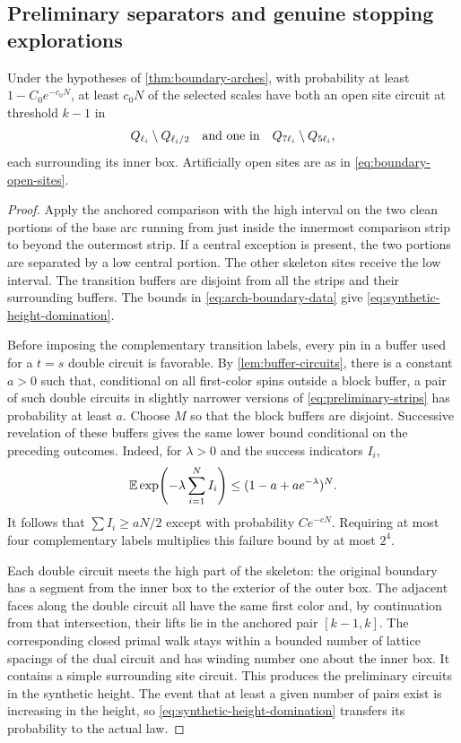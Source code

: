 \subsection{Preliminary separators and genuine stopping explorations}

\begin{lemma}\label{lem:preliminary-circuits}
Under the hypotheses of \cref{thm:boundary-arches}, with probability at least
$1-C_0e^{-c_0N}$, at least $c_0N$ of the selected scales have both an open
site circuit at threshold $k-1$ in
\begin{equation}\label{eq:preliminary-strips}
 Q_{\ell_i}\setminus Q_{\ell_i/2}
       \quad\hbox{and one in}\quad
 Q_{7\ell_i}\setminus Q_{5\ell_i},
\end{equation}
each surrounding its inner box.  Artificially open sites are as in
\eqref{eq:boundary-open-sites}.
\end{lemma}

\begin{proof}
Apply the anchored comparison with the high interval on the two clean
portions of the base arc running from just inside the innermost comparison
strip to beyond the outermost strip.  If a central exception is present,
the two portions are separated by a low central portion.  The other
skeleton sites receive the low interval.  The transition buffers are
disjoint from all the strips and their surrounding buffers.  The bounds in
\eqref{eq:arch-boundary-data} give \eqref{eq:synthetic-height-domination}.

Before imposing the complementary transition labels, every pin in a buffer
used for a $t=s$ double circuit is favorable.  By
\cref{lem:buffer-circuits}, there is a constant $a>0$ such that, conditional
on all first-color spins outside a block buffer, a pair of such double
circuits in slightly narrower versions of \eqref{eq:preliminary-strips}
has probability at least $a$.  Choose $M$ so that the block buffers are
disjoint.  Successive revelation of these buffers gives the same lower
bound conditional on the preceding outcomes.  Indeed, for $\lambda>0$ and
the success indicators $I_i$,
\[
 \mathbb E\exp\!\left(-\lambda\sum_{i=1}^N I_i\right)
       \le (1-a+ae^{-\lambda})^N.
\]
It follows that $\sum I_i\ge aN/2$ except with probability $C e^{-cN}$.
Requiring at most four complementary labels multiplies this failure bound
by at most $2^4$.

Each double circuit meets the high part of the skeleton: the original
boundary has a segment from the inner box to the exterior of the outer
box.  The adjacent faces along the double circuit all have the same first
color and, by continuation from that intersection, their lifts lie in the
anchored pair $[k-1,k]$.  The corresponding closed primal walk stays within
a bounded number of lattice spacings of the dual circuit and has winding
number one about the inner box.  It contains a simple surrounding site
circuit.  This produces the preliminary circuits in the synthetic height.
The event that at least a given number of pairs exist is increasing in the
height, so \eqref{eq:synthetic-height-domination} transfers its probability
to the actual law.
\end{proof}


